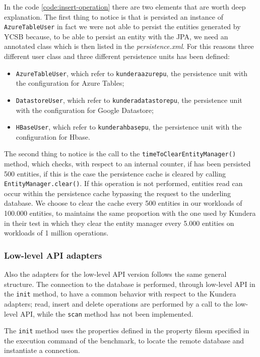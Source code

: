 \noindent In the code \ref{code:insert-operation} there are two elements that are worth deep explanation. The first thing to notice is that is persisted an instance of \texttt{AzureTableUser} in fact we were not able to persist the entities generated by YCSB because, to be able to persist an entity with the JPA, we need an annotated class which is then listed in the \textit{persistence.xml}. For this reasons three different user class and three different persistence units has been defined:
\begin{itemize}
\item \texttt{AzureTableUser}, which refer to \texttt{kundera\textunderscore azure\textunderscore pu}, the persistence unit with the configuration for Azure Tables;
\item \texttt{DatastoreUser}, which refer to \texttt{kundera\textunderscore datastore\textunderscore pu}, the persistence unit with the configuration for Google Datastore;
\item \texttt{HBaseUser}, which refer to \texttt{kundera\textunderscore hbase\textunderscore pu}, the persistence unit with the configuration for Hbase.
\end{itemize} 
\noindent The second thing to notice is the call to the \texttt{timeToClearEntityManager()} method, which checks, with respect to an internal counter, if has been persisted 500 entities, if this is the case the persistence cache is cleared by calling \texttt{EntityManager.clear()}. If this operation is not performed, entities read can occur within the persistence cache bypassing the request to the underling database. We choose to clear the cache every 500 entities in our workloads of 100.000 entities, to maintains the same proportion with the one used by Kundera in their test in which they clear the entity manager every 5.000 entities on workloads of 1 million operations.

\subsubsection{Low-level API adapters}
Also the adapters for the low-level API version follows the same general structure. The connection to the database is performed, through low-level API in the \texttt{init} method, to have a common behavior with respect to the Kundera adapters; read, insert and delete operations are performed by a call to the low-level API, while the \texttt{scan} method has not been implemented.

\noindent The \texttt{init} method uses the properties defined in the property filesm specified in the execution command of the benchmark, to locate the remote database and instantiate a connection.

